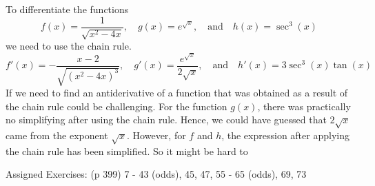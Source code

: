 \documentclass[12pt]{article}
\begin{document}
To differentiate the functions
$$ f(x) = \frac{1}{\sqrt{x^2 - 4x}}, \quad g(x) = e^{\sqrt{x}}, \quad \text{and} \quad h(x) = \sec^3(x) $$
we need to use the chain rule.
$$f'(x) = -\frac{x-2}{\sqrt{(x^2 - 4x)^3}}, \quad 
g'(x) = \frac{e^{\sqrt{x}}}{2\sqrt{x}}, \quad \text{and} \quad h'(x) = 3\sec^3(x)\tan(x) $$
If we need to find an antiderivative of a function that was obtained as a result of the chain rule could be challenging. For the function $g(x)$, there was practically no simplifying after using the chain rule. Hence, we could have guessed that $2\sqrt{x}$ came from the exponent $\sqrt{x}$. However, for $f$ and $h$, the expression after applying the chain rule has been simplified. So it might be hard to 

\vfill


Assigned Exercises: (p 399) 7 - 43 (odds), 45, 47, 55 - 65 (odds), 69, 73
\end{document}
